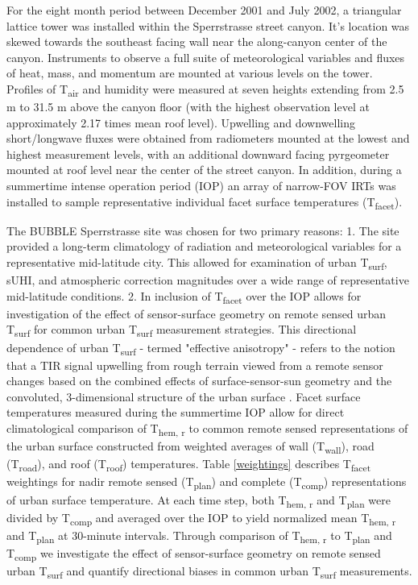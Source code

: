 For the eight month period between December 2001 and July 2002, a triangular lattice tower was installed within the Sperrstrasse street canyon. It's location was skewed towards the southeast facing wall near the along-canyon center of the canyon. Instruments to observe a full suite of meteorological variables and fluxes of heat, mass, and momentum are mounted at various levels on the tower. Profiles of T\textsubscript{air} and humidity were measured at seven heights extending from 2.5 \si{m} to 31.5 \si{m} above the canyon floor (with the highest observation level at approximately 2.17 times mean roof level). Upwelling and downwelling short/longwave fluxes were obtained from radiometers mounted at the lowest and highest measurement levels, with an additional downward facing pyrgeometer mounted at roof level near the center of the street canyon. In addition, during a summertime intense operation period (IOP) an array of narrow-FOV IRTs was installed to sample representative individual facet surface temperatures (T\textsubscript{facet}).

The BUBBLE Sperrstrasse site was chosen for two primary reasons: 1. The site provided a long-term climatology of radiation and meteorological variables for a representative mid-latitude city. This allowed for examination of urban T\textsubscript{surf}, sUHI, and atmospheric correction magnitudes over a wide range of representative mid-latitude conditions. 2.  In inclusion of T\textsubscript{facet} over the IOP allows for investigation of the effect of sensor-surface geometry on remote sensed urban T\textsubscript{surf} for common urban T\textsubscript{surf} measurement strategies. This directional dependence of urban T\textsubscript{surf} - termed "effective anisotropy" - refers to the notion that a TIR signal upwelling from rough terrain viewed from a remote sensor changes based on the combined effects of surface-sensor-sun geometry and the convoluted, 3-dimensional structure of the urban surface \cite{Voogt1998a}. Facet surface temperatures measured during the summertime IOP allow for direct climatological comparison of T\textsubscript{hem, r} to common remote sensed representations of the urban surface constructed from weighted averages of wall (T\textsubscript{wall}), road (T\textsubscript{road}), and roof (T\textsubscript{roof}) temperatures. Table \ref{weightings} describes T\textsubscript{facet} weightings for nadir remote sensed (T\textsubscript{plan}) and complete (T\textsubscript{comp}) representations of urban surface temperature. At each time step, both T\textsubscript{hem, r} and T\textsubscript{plan} were divided by T\textsubscript{comp} and averaged over the IOP to yield normalized mean T\textsubscript{hem, r} and T\textsubscript{plan} at 30-minute intervals. Through comparison of T\textsubscript{hem, r} to T\textsubscript{plan} and T\textsubscript{comp} we investigate the effect of sensor-surface geometry on remote sensed urban T\textsubscript{surf} and quantify directional biases in common urban T\textsubscript{surf} measurements. 

